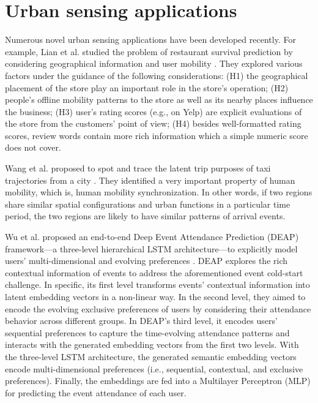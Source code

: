 
\section{Urban sensing applications}
Numerous novel urban sensing applications have been developed
recently. For example, Lian et al. studied
the problem of restaurant survival prediction by considering geographical 
information and user mobility \cite{p4}. They explored various factors under the guidance of the 
following considerations: (H1) the geographical placement of the
store play an important role in the store’s operation; (H2)
people’s offline mobility patterns to the store as well as its nearby places influence the business;
 (H3) user’s rating scores
(e.g., on Yelp) are explicit evaluations of the store from the
customers’ point of view; (H4) besides well-formatted rating
scores, review words contain more rich information which a
simple numeric score does not cover.

\noindent Wang et al. proposed to spot and trace the latent trip purposes of taxi
trajectories from a city \cite{p5}. They identified a very important
property of human mobility, which is, human mobility synchronization. In other words, 
if two regions share similar spatial configurations and urban functions in a particular 
time period, the two regions are likely to have similar patterns of arrival events.

\noindent Wu et al. proposed an end-to-end Deep Event Attendance
Prediction (DEAP) framework—a three-level hierarchical LSTM architecture—to explicitly model 
users’ multi-dimensional and evolving preferences \cite{p6}. DEAP explores the rich contextual 
information of events to address the aforementioned event cold-start challenge. In specific, its 
first level transforms events’ contextual information into latent embedding vectors in a non-linear way. 
In the second level, they aimed to encode the evolving exclusive preferences of users by considering their
 attendance behavior across different groups. In DEAP’s third level, it encodes users’ sequential 
 preferences to capture the time-evolving attendance patterns and interacts with the generated 
 embedding vectors from the first two levels.
With the three-level LSTM architecture, the generated semantic embedding vectors encode 
multi-dimensional preferences (i.e., sequential, contextual, and exclusive preferences). 
Finally, the embeddings are fed into a Multilayer Perceptron (MLP) for 
predicting the event attendance of each user. 

